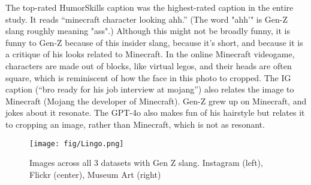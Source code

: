 The top-rated HumorSkills caption was the highest-rated caption in the entire study. It reads ``minecraft character looking ahh.'' (The word "ahh'" is Gen-Z slang roughly meaning "ass".) Although this might not be broadly funny, it is funny to Gen-Z because of this insider slang, because it's short, and because it is a critique of his looks related to Minecraft. In the online Minecraft videogame, characters are made out of blocks, like virtual legos, and their heads are often square, which is reminiscent of how the face in this photo to cropped.
The IG caption (``bro ready for his job interview at mojang'') also relates the image to Minecraft (Mojang the developer of Minecraft). Gen-Z grew up on Minecraft, and jokes about it resonate. The GPT-4o also makes fun of his hairstyle but relates it to cropping an image, rather than Minecraft, which is not as resonant. 



\begin{figure*}[h]
    \centering
    \texttt{[image: fig/Lingo.png]}
    \caption{Images across all 3 datasets with Gen Z slang. Instagram (left), Flickr (center), Museum Art (right)}
    \label{fig:visual_images}
\end{figure*}





